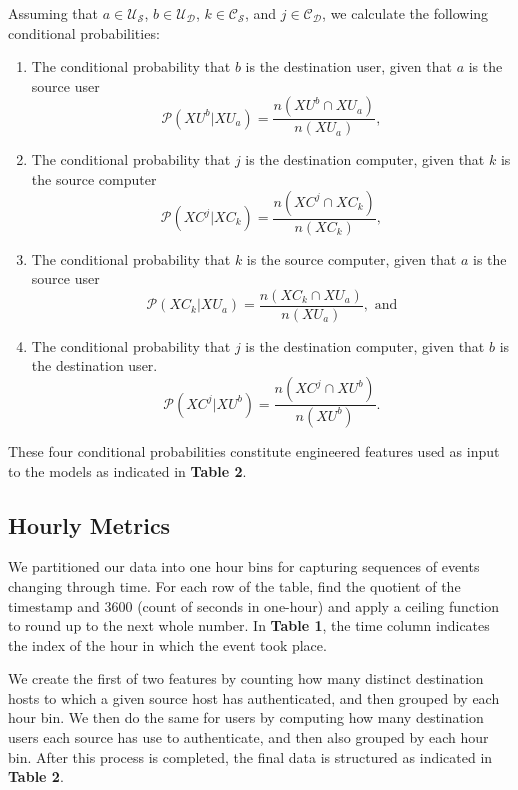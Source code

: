 \documentclass[sigconf]{acmart}
\begin{document}
Assuming that $a\in\mathcal{U_S}$, $b\in\mathcal{U_D}$, $k\in\mathcal{C_S}$, and $j\in\mathcal{C_D}$, we calculate the following conditional probabilities:
\begin{enumerate}
  \item The conditional probability that $b$ is the destination user, given that $a$ is the source user
  $$\mathcal P(XU^b|XU_a) = \frac{n(XU^b\cap XU_a)}{n(XU_a)},$$
  \item The conditional probability that $j$ is the destination computer, given that $k$ is the source computer
  $$\mathcal P(XC^j|XC_k) = \frac{n(XC^j\cap XC_k)}{n(XC_k)},$$
  \item The conditional probability that $k$ is the source computer, given that $a$ is the source user
  $$\mathcal P(XC_k|XU_a) = \frac{n(XC_k\cap XU_a)}{n(XU_a)},\textrm{ and}$$
  \item The conditional probability that $j$ is the destination computer, given that $b$ is the destination user.
  $$\mathcal P(XC^j|XU^b) = \frac{n(XC^j\cap XU^b)}{n(XU^b)}.$$
\end{enumerate}

These four conditional probabilities constitute engineered features used as input to the models as indicated in \textbf{Table 2}.

%
%

\subsection{Hourly Metrics}
We partitioned our data into one hour bins for capturing sequences of events changing through time.  For each row of the table, find the quotient of the timestamp and 3600 (count of seconds in one-hour) and apply a ceiling function to round up to the next whole number.  In \textbf{Table 1}, the time column indicates the index of the hour in which the event took place.

We create the first of two features by counting how many distinct destination hosts to which a given source host has authenticated, and then grouped by each hour bin.  We then do the same for users by computing how many
destination users each source has use to authenticate, and then also grouped by each hour bin. After this process is completed, the final data is structured as indicated in \textbf{Table 2}.
\end{document}
